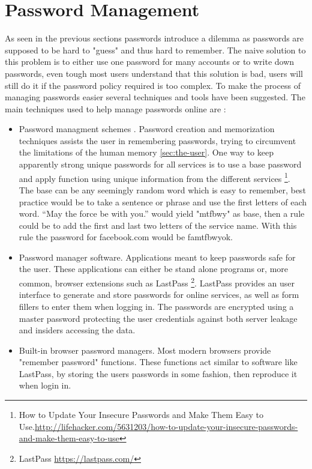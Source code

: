 \section{Password Management}
As seen in the previous sections passwords introduce a dilemma as passwords are supposed to be hard to "guess" and thus hard to remember. The naive solution to this problem is to either use one password for many accounts or to write down passwords, even tough most users understand that this solution is bad, users will still do it if the password policy required is too complex. To make the process of managing passwords easier several techniques and tools have been suggested. The main techniques used to help manage passwords online are \cite{management-strategies}: 
\begin{itemize}
    \item{Password managment schemes \cite{password-schemes}.} Password creation and memorization techniques assists the user in remembering passwords, trying to circumvent the limitations of the human memory \autoref{sec:the-user}. One way to keep apparently strong unique passwords for all services is to use a base password and apply function using unique information from the different services \footnote{How to Update Your Insecure Passwords and Make Them Easy to Use.\url{http://lifehacker.com/5631203/how-to-update-your-insecure-passwords-and-make-them-easy-to-use}}. The base can be any seemingly random word which is easy to remember, best practice would be to take a sentence or phrase and use the first letters of each word. “May the force be with you.” would yield "mtfbwy" as base, then a rule could be to add the first and last two letters of the service name. With this rule the password for facebook.com would be famtfbwyok.
    \item{Password manager software.} Applications meant to keep passwords safe for the user. These applications can either be stand alone programs or, more common, browser extensions such as LastPass \footnote{LastPass \url{https://lastpass.com/}}. LastPass provides an user interface to generate and store passwords for online services, as well as form fillers to enter them when logging in. The passwords are encrypted using a master password protecting the user credentials against both server leakage and insiders accessing the data.
    \item{Built-in browser password managers.} Most modern browsers provide "remember password" functions. These functions act similar to software like LastPass, by storing the users passwords in some fashion, then reproduce it when login in. 
\end{itemize}

